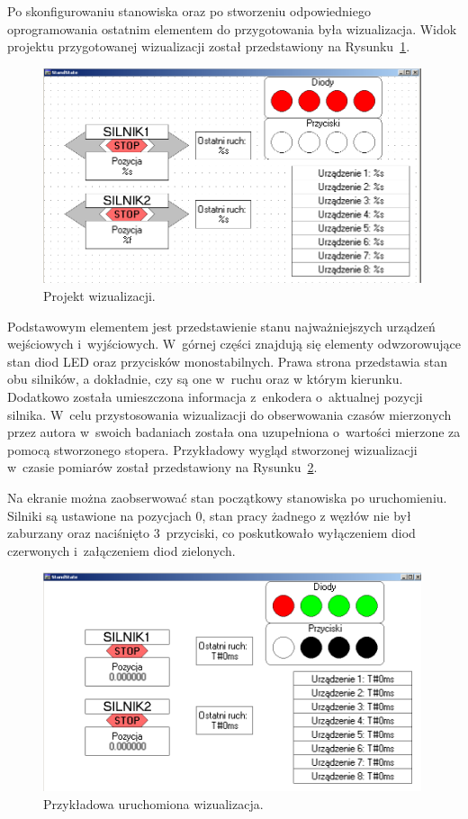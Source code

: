 Po skonfigurowaniu stanowiska oraz po stworzeniu odpowiedniego oprogramowania ostatnim elementem do przygotowania była wizualizacja. Widok projektu przygotowanej wizualizacji został przedstawiony na Rysunku~\ref{vis_szablon}.
\begin{figure}[!htb] 	\centering 	\includegraphics[width=0.99\textwidth]{images/vis_szablon} \caption{Projekt wizualizacji.} \label{vis_szablon} \end{figure}

Podstawowym elementem jest przedstawienie stanu najważniejszych urządzeń wejściowych i~wyjściowych. W~górnej części znajdują się elementy odwzorowujące stan diod LED oraz przycisków monostabilnych. Prawa strona przedstawia stan obu silników, a dokładnie, czy są one w~ruchu oraz w którym kierunku. Dodatkowo została umieszczona informacja z~enkodera o~aktualnej pozycji silnika. W~celu przystosowania wizualizacji do obserwowania czasów mierzonych przez autora w~swoich badaniach została ona uzupełniona o~wartości mierzone za pomocą stworzonego stopera. 
\noindent Przykładowy wygląd stworzonej wizualizacji w~czasie pomiarów został przedstawiony na Rysunku~\ref{vis_inuse}.

\noindent Na ekranie można zaobserwować stan początkowy stanowiska po uruchomieniu. Silniki są ustawione na pozycjach 0, stan pracy żadnego z węzłów nie był zaburzany oraz naciśnięto 3~przyciski, co poskutkowało wyłączeniem diod czerwonych i~załączeniem diod zielonych.
\clearpage
\begin{figure}[!htb] 	\centering 	\includegraphics[width=0.99\textwidth]{images/vis_inuse2} \caption{Przykładowa uruchomiona wizualizacja.} \label{vis_inuse} \end{figure}
\vspace{-15mm}
